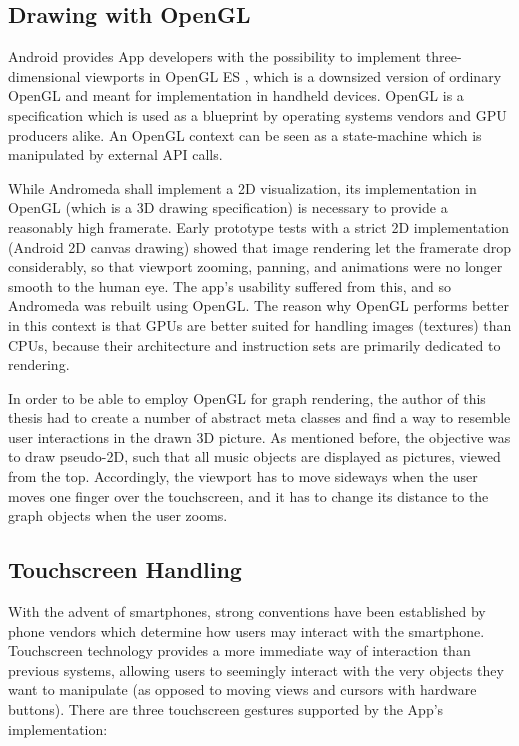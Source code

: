 \subsection{Drawing with OpenGL}

Android provides App developers with the possibility to implement three-dimensional viewports in OpenGL ES \cite{url:opengles}, which is a downsized version of ordinary OpenGL and meant for implementation in handheld devices. OpenGL is a specification which is used as a blueprint by operating systems vendors and GPU producers alike. An OpenGL context can be seen as a state-machine which is manipulated by external API calls.

While Andromeda shall implement a 2D visualization, its implementation in OpenGL (which is a 3D drawing specification) is necessary to provide a reasonably high framerate. Early prototype tests with a strict 2D implementation (Android 2D canvas drawing) showed that image rendering let the framerate drop considerably, so that viewport zooming, panning, and animations were no longer smooth to the human eye. The app's usability suffered from this, and so Andromeda was rebuilt using OpenGL. The reason why OpenGL performs better in this context is that GPUs are better suited for handling images (textures) than CPUs, because their architecture and instruction sets are primarily dedicated to rendering.

In order to be able to employ OpenGL for graph rendering, the author of this thesis had to create a number of abstract meta classes and find a way to resemble user interactions in the drawn 3D picture. As mentioned before, the objective was to draw pseudo-2D, such that all music objects are displayed as pictures, viewed from the top. Accordingly, the viewport has to move sideways when the user moves one finger over the touchscreen, and it has to change its distance to the graph objects when the user zooms.

\subsection{Touchscreen Handling}

With the advent of smartphones, strong conventions have been established by phone vendors which determine how users may interact with the smartphone. Touchscreen technology provides a more immediate way of interaction than previous systems, allowing users to seemingly interact with the very objects they want to manipulate (as opposed to moving views and cursors with hardware buttons).
There are three touchscreen gestures supported by the App's implementation:

